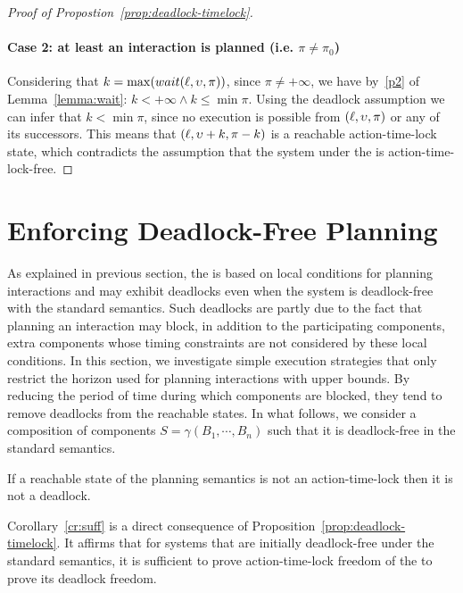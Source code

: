 \begin{proof}[Proof of Propostion~\ref{prop:deadlock-timelock}]
\begin{enumerate}
\begin{enumerate}
    \end{enumerate}
\end{enumerate}

\paragraph*{Case 2: at least an interaction is planned (i.e. $\pi \neq \pi_0$)}
Considering that $k=\max(wait(\ell,\upsilon,\pi))$, since $\pi\neq+\infty$, we have by~\ref{p2} of 
Lemma~\ref{lemma:wait}: $k<+\infty\wedge k\le\min\pi$. Using the deadlock assumption we can 
infer that $k<\min\pi$, since 
no execution is possible from $(\ell,\upsilon,\pi)$ or any of its successors. 
This means that $(\ell,\upsilon+k,\pi-k)$ is a reachable action-time-lock state, 
which contradicts the assumption that the system under the \lpsabrb is action-time-lock-free.
\end{proof}

\section{Enforcing Deadlock-Free Planning}
\label{sec4}
As explained in previous section, the \lps is based on local conditions for planning interactions
and may exhibit deadlocks even when the system is deadlock-free with the standard semantics.
Such deadlocks are partly due to the fact that planning an interaction may block, in addition to 
the participating components, extra components whose timing constraints are not considered by 
these local conditions. In this section, we investigate simple execution strategies that only 
restrict the horizon used for planning interactions with upper bounds.
By reducing the period of time during which components are blocked, they tend to remove deadlocks
from the reachable states. 
In what follows, we consider a composition of components $S = \gamma(B_1,\cdots,B_n)$ 
such that it is deadlock-free in the standard semantics.

\begin{corollary}
  \label{cr:suff}
  If a reachable state of the planning semantics is not an action-time-lock then it is not
a deadlock.
\end{corollary}
Corollary~\ref{cr:suff} is a direct consequence of Proposition~\ref{prop:deadlock-timelock}.
It affirms that for systems that are initially deadlock-free under the standard semantics, 
it is sufficient to prove action-time-lock freedom of the \lpsabrb 
to prove its deadlock freedom.

